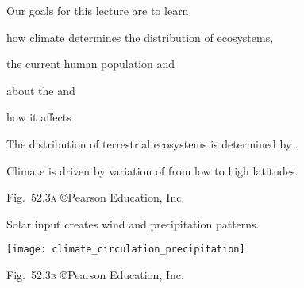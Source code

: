 \documentclass[t]{beamer}
\begin{document}

\begin{frame}{Our goals for this lecture are to learn}

	\hangpara how climate determines the distribution of ecosystems,
	
	\hangpara the current human population and 
	
	\hangpara about the  and
	
	\hangpara how it affects  
	
\end{frame}
%
{
	\begin{frame}[b]{The distribution of terrestrial ecosystems is determined by .}
		
	\end{frame}
}
%


{
	\begin{frame}[b]{Climate is driven by variation of  from low to high latitudes.}
		
		\hfill \tiny Fig.~52.3\textsc{a} \copyright Pearson Education, Inc.
	\end{frame}
}
%
{
	\begin{frame}[t]{Solar input creates wind and precipitation patterns.}
		
		\texttt{[image: climate\_circulation\_precipitation]}
		
		\vfilll
		
		\hfill \tiny Fig.~52.3\textsc{b} \copyright Pearson Education, Inc.
	\end{frame}
}
%
\end{document}

